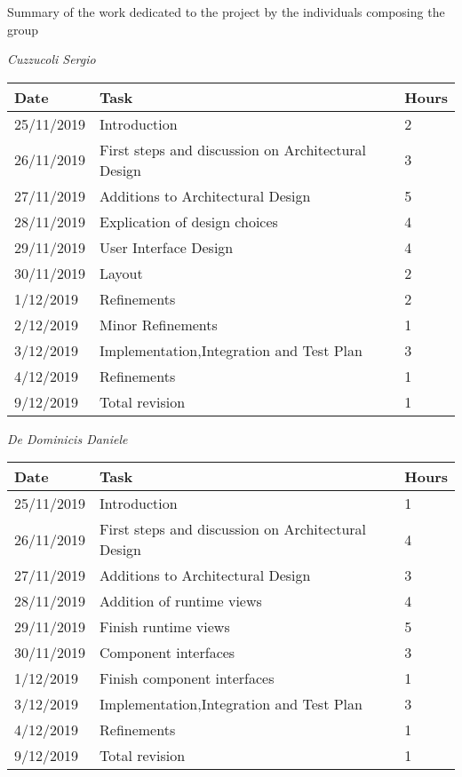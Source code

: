 Summary of the work dedicated to the project by the individuals composing the group

\vspace{1cm}

\textit{Cuzzucoli Sergio}

\hfill

\begin{tabular}{|l|l|l|}

\hline

\textbf{Date} & \textbf{Task} & \textbf{Hours} \\ \hline
25/11/2019 & Introduction &  2 \\ \hline
26/11/2019 & First steps and discussion on Architectural Design & 3 \\ \hline
27/11/2019 & Additions to Architectural Design & 5 \\ \hline
28/11/2019 & Explication of design choices & 4 \\ \hline
29/11/2019 & User Interface Design & 4 \\ \hline
30/11/2019 & Layout & 2 \\ \hline
1/12/2019 & Refinements & 2\\ \hline
2/12/2019 & Minor Refinements & 1\\ \hline
3/12/2019 & Implementation,Integration and Test Plan & 3\\ \hline
4/12/2019 & Refinements & 1\\ \hline
9/12/2019 & Total revision & 1\\ \hline
\end{tabular}

\vspace{1cm}

\textit{De Dominicis Daniele}

\hfill

\begin{tabular}{|l|l|l|}

\hline

\textbf{Date} & \textbf{Task} & \textbf{Hours} \\ \hline
25/11/2019 & Introduction &  1 \\ \hline
26/11/2019 & First steps and discussion on Architectural Design & 4 \\ \hline
27/11/2019 & Additions to Architectural Design & 3 \\ \hline
28/11/2019 & Addition of runtime views & 4 \\ \hline
29/11/2019 & Finish runtime views & 5 \\ \hline
30/11/2019 & Component interfaces & 3 \\ \hline
1/12/2019 & Finish component interfaces & 1\\ \hline
3/12/2019 & Implementation,Integration and Test Plan & 3\\ \hline
4/12/2019 & Refinements & 1\\ \hline
9/12/2019 & Total revision & 1\\ \hline
\end{tabular}